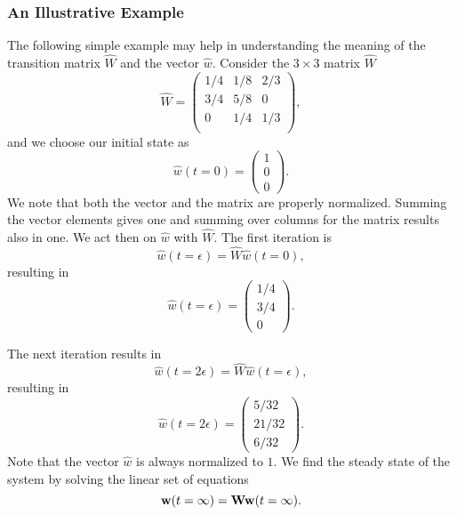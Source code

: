 \subsubsection{An Illustrative Example}
The following simple example may help in understanding the meaning of 
the transition matrix $\hat{W}$ and the vector $\hat{w}$.
Consider the $3\times 3$ matrix $\hat{W}$
\[
   \hat{W} = \left(\begin{array}{ccc} 1/4 & 1/8 & 2/3\\                   
                                 3/4 & 5/8 & 0\\                   
                                 0 & 1/4 & 1/3\\   \end{array} \right),
\]
and we choose our initial state as 
\[
\hat{w}(t=0)=  \left(\begin{array}{c} 1\\                   
                                 0\\                   
                                 0 \end{array} \right).
\]
We note that both the vector and the matrix are properly normalized. Summing the vector elements gives one and
summing over columns for the matrix results also in one.
We act then on $\hat{w}$ with $\hat{W}$.
The first iteration is
\[
   \hat{w}(t=\epsilon) = \hat{W}\hat{w}(t=0),
\]   
resulting in
\[
\hat{w}(t=\epsilon)=  \left(\begin{array}{c} 1/4\\                   
                                3/4 \\                   
                                 0 \end{array} \right).
\]

The next iteration results in 
\[
   \hat{w}(t=2\epsilon) = \hat{W}\hat{w}(t=\epsilon),
\]   
resulting in
\[
\hat{w}(t=2\epsilon)=  \left(\begin{array}{c} 5/32\\                   
                                21/32 \\                   
                                6/32 \end{array} \right).
\]
Note that the vector $\hat{w}$ is always normalized to $1$. 
We find the steady state of the system by solving the linear set of equations
\[ {\bf w}(t=\infty) = {\bf Ww}(t=\infty). \]

